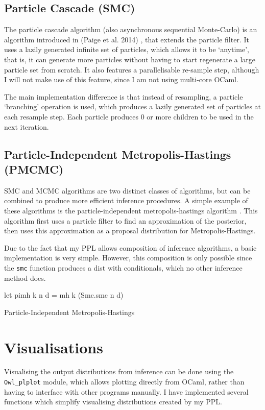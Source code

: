 \documentclass[sigconf]{acmart}
\begin{document}
\subsection{Particle Cascade (SMC)} \label{sec:pc}
The particle cascade algorithm (also asynchronous sequential Monte-Carlo) is an algorithm introduced in (Paige et al. 2014) \cite{paige2014asynchronous}, that extends the particle filter. It uses a lazily generated infinite set of particles, which allows it to be `anytime', that is, it can generate more particles without having to start regenerate a large particle set from scratch. It also features a parallelisable re-sample step, although I will not make use of this feature, since I am not using multi-core OCaml.

The main implementation difference is that instead of resampling, a particle `branching' operation is used, which produces a lazily generated set of particles at each resample step. Each particle produces 0 or more children to be used in the next iteration.

\subsection{Particle-Independent Metropolis-Hastings (PMCMC)} \label{sec:pimh}

SMC and MCMC algorithms are two distinct classes of algorithms, but can be combined to produce more efficient inference procedures. A simple example of these algorithms is the particle-independent metropolis-hastings algorithm \cite{pmcmc}. This algorithm first uses a particle filter to find an approximation of the posterior, then uses this approximation as a proposal distribution for Metropolis-Hastings.

Due to the fact that my PPL allows composition of inference algorithms, a basic implementation is very simple. However, this composition is only possible since the \texttt{smc} function produces a dist with conditionals, which no other inference method does.

\begin{listing}
  \begin{ocamlcode-in}
    let pimh k n d = mh k (Smc.smc n d)
  \end{ocamlcode-in}
  \caption{Particle-Independent Metropolis-Hastings}
\end{listing}


\section{Visualisations}
Visualising the output distributions from inference can be done using the \texttt{Owl\_plplot} module, which allows plotting directly from OCaml, rather than having to interface with other programs manually. I have implemented several functions which simplify visualising distributions created by my PPL.
\end{document}
